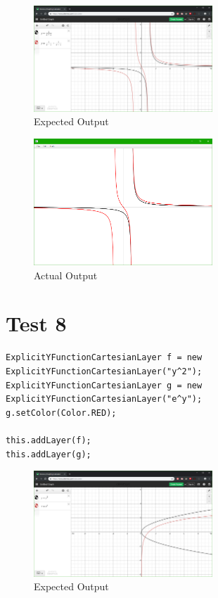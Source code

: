 \documentclass[../../../main.tex]{subfiles}
\begin{document}
\begin{figure}[H]
	\centering
	\includegraphics[width=0.6\textwidth]{tests/expected7}
	\caption{Expected Output}
\end{figure}

\begin{figure}[H]
	\centering
	\includegraphics[width=0.6\textwidth]{tests/actual7}
	\caption{Actual Output}
\end{figure}
\newpage

\section{Test 8}
\begin{verbatim}
ExplicitYFunctionCartesianLayer f = new ExplicitYFunctionCartesianLayer("y^2");
ExplicitYFunctionCartesianLayer g = new ExplicitYFunctionCartesianLayer("e^y");
g.setColor(Color.RED);

this.addLayer(f);
this.addLayer(g);
\end{verbatim}

\begin{figure}[H]
	\centering
	\includegraphics[width=0.6\textwidth]{tests/expected8}
	\caption{Expected Output}
\end{figure}
\end{document}
